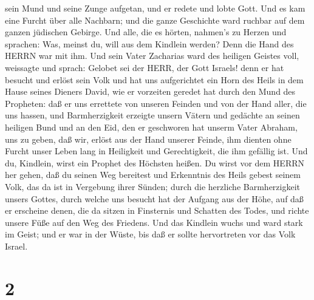 sein Mund und seine Zunge aufgetan, und er redete und lobte Gott.
 Und es kam eine Furcht über alle Nachbarn; und die ganze
Geschichte ward ruchbar auf dem ganzen jüdischen Gebirge. 
Und alle, die es hörten, nahmen's zu Herzen und sprachen: Was, meinst
du, will aus dem Kindlein werden? Denn die Hand des HERRN war mit ihm.
 Und sein Vater Zacharias ward des heiligen Geistes voll,
weissagte und sprach:  Gelobet sei der HERR, der Gott
Israels! denn er hat besucht und erlöst sein Volk  und hat
uns aufgerichtet ein Horn des Heils in dem Hause seines Dieners David,
 wie er vorzeiten geredet hat durch den Mund des Propheten:
 daß er uns errettete von unseren Feinden und von der Hand
aller, die uns hassen,  und Barmherzigkeit erzeigte unsern
Vätern und gedächte an seinen heiligen Bund  und an den
Eid, den er geschworen hat unserm Vater Abraham, uns zu geben,
 daß wir, erlöst aus der Hand unserer Feinde, ihm dienten
ohne Furcht unser Leben lang  in Heiligkeit und
Gerechtigkeit, die ihm gefällig ist.  Und du, Kindlein,
wirst ein Prophet des Höchsten heißen. Du wirst vor dem HERRN her gehen,
daß du seinen Weg bereitest  und Erkenntnis des Heils
gebest seinem Volk, das da ist in Vergebung ihrer Sünden; 
durch die herzliche Barmherzigkeit unsers Gottes, durch welche uns
besucht hat der Aufgang aus der Höhe,  auf daß er erscheine
denen, die da sitzen in Finsternis und Schatten des Todes, und richte
unsere Füße auf den Weg des Friedens.  Und das Kindlein
wuchs und ward stark im Geist; und er war in der Wüste, bis daß er
sollte hervortreten vor das Volk Israel.

\hypertarget{section-1}{%
\section{2}\label{section-1}}

